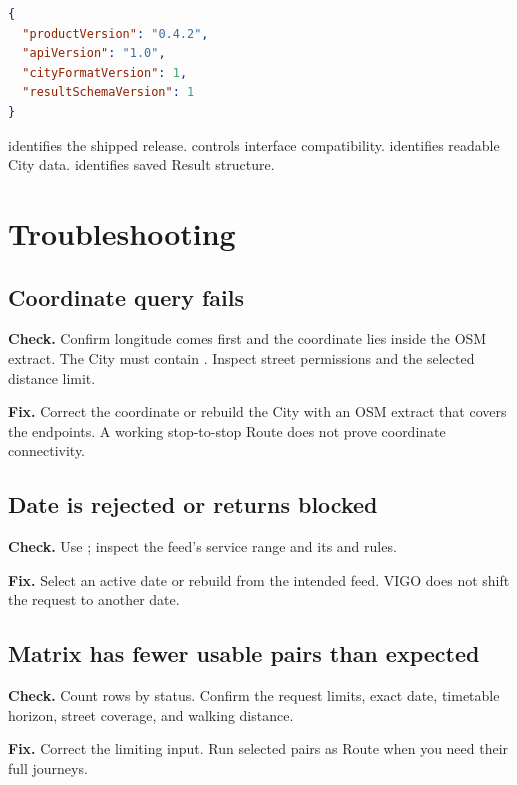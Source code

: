 \documentclass[10pt,letterpaper]{article}
\begin{document}
\begin{lstlisting}[language=json]
{
  "productVersion": "0.4.2",
  "apiVersion": "1.0",
  "cityFormatVersion": 1,
  "resultSchemaVersion": 1
}
\end{lstlisting}

 identifies the shipped release.  controls interface compatibility.  identifies readable City data.  identifies saved Result structure.

\section{Troubleshooting}

\subsection{Coordinate query fails}

\textbf{Check.} Confirm longitude comes first and the coordinate lies inside the OSM extract. The City must contain . Inspect street permissions and the selected distance limit.

\textbf{Fix.} Correct the coordinate or rebuild the City with an OSM extract that covers the endpoints. A working stop-to-stop Route does not prove coordinate connectivity.

\subsection{Date is rejected or returns blocked}

\textbf{Check.} Use ; inspect the feed's service range and its  and  rules.

\textbf{Fix.} Select an active date or rebuild from the intended feed. VIGO does not shift the request to another date.

\subsection{Matrix has fewer usable pairs than expected}

\textbf{Check.} Count rows by status. Confirm the request limits, exact date, timetable horizon, street coverage, and walking distance.

\textbf{Fix.} Correct the limiting input. Run selected pairs as Route when you need their full journeys.
\end{document}
